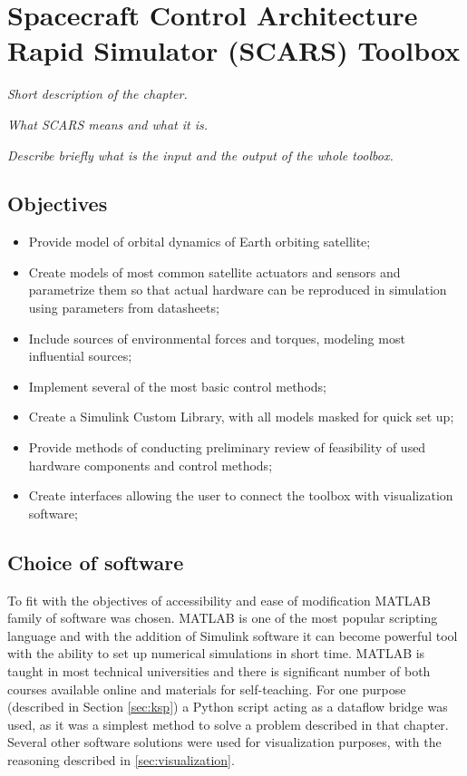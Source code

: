 \section{Spacecraft Control Architecture Rapid Simulator (SCARS) Toolbox}\label{sec:toolbox}
\textit{Short description of the chapter.}

\textit{What SCARS means and what it is.}

\textit{Describe briefly what is the input and the output of the whole toolbox.}


\subsection{Objectives}\label{toolbox:objectives}

    \begin{itemize}
        \item Provide model of orbital dynamics of Earth orbiting satellite;
        \item Create models of most common satellite actuators and sensors and parametrize them so that actual hardware can be reproduced in simulation using parameters from datasheets;
        \item Include sources of environmental forces and torques, modeling most influential sources;
        \item Implement several of the most basic control methods;
        \item Create a Simulink Custom Library, with all models masked for quick set up;
        \item Provide methods of conducting preliminary review of feasibility of used hardware components and control methods;
        \item Create interfaces allowing the user to connect the toolbox with visualization software;
    \end{itemize}

\subsection{Choice of software}
    To fit with the objectives of accessibility and ease of modification MATLAB family of software was chosen. MATLAB is one of the most popular scripting language and with the addition of Simulink software it can become powerful tool with the ability to set up numerical simulations in short time. MATLAB is taught in most technical universities and there is significant number of both courses available online and materials for self-teaching. For one purpose (described in Section \ref{sec:ksp}) a Python script acting as a dataflow bridge was used, as it was a simplest method to solve a problem described in that chapter. Several other software solutions were used for visualization purposes, with the reasoning described in \autoref{sec:visualization}.

